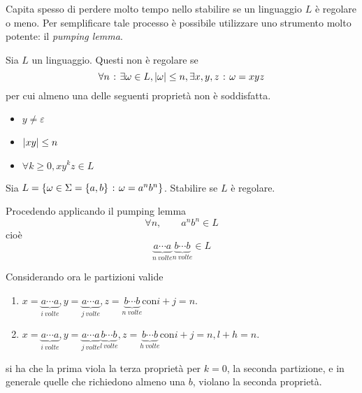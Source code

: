 \documentclass{subfiles}
\begin{document}
Capita spesso di perdere molto tempo nello stabilire se un linguaggio \(L\) è regolare o meno.
Per semplificare tale processo è possibile utilizzare uno strumento molto potente: il \emph{pumping lemma}.

\begin{Lemma}
    Sia \(L\) un linguaggio. Questi non è regolare se
    \[
        \forall n \operatorname{\: {:} \:} \exists \omega \in L, \abs{\omega} \le n, \exists x,y,z \operatorname{\: {:} \:} \omega = xyz
    \]
    per cui almeno una delle seguenti proprietà non è soddisfatta.
    \begin{multicols}{3}
        \begin{itemize}
            \item \(y \neq \varepsilon\)
            \item \(\abs{xy} \le n\)
            \item \(\forall k \ge 0, xy^{k}z \in L\)
        \end{itemize}
    \end{multicols}
\end{Lemma}

\begin{Exercise*}
    Sia \(L = \left\{\omega \in \Sigma = \left\{a, b\right\} \operatorname{\: {:} \:} \omega = a^{n}b^{n}\right\}\). Stabilire se \(L\) è regolare.
    \begin{Solution*}
        Procedendo applicando il pumping lemma
        \[
            \forall n, \qquad a^{n}b^{n} \in L
        \]
        cioè
        \[
            \underbrace{a \cdots a}_{n \ volte} \underbrace{b \cdots b}_{n \ volte} \in L
        \]

        \noindent Considerando ora le partizioni valide
        \begin{enumerate}
            \item \(x = \underbrace{a \cdots a}_{i \ volte},  y = \underbrace{a \cdots a}_{j \ volte}, z = \underbrace{b\cdots b}_{n \ volte} \text{con} i + j = n\).
            \item \(x = \underbrace{a \cdots a}_{i \ volte}, y = \underbrace{a \cdots a}_{j \ volte}\underbrace{b \cdots b}_{l \ volte}, z = \underbrace{b \cdots b}_{h \ volte} \text{con} i + j = n, l + h = n\).
        \end{enumerate}
        si ha che la prima viola la terza proprietà per \(k = 0\), la seconda partizione, e in generale quelle che richiedono almeno una \(b\), violano la seconda proprietà.
    \end{Solution*}
\end{Exercise*}
\end{document}
